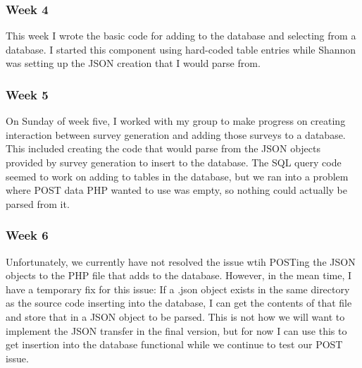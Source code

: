 \documentclass[letterpaper,10pt,serif, draftclsnofoot,onecolumn, compsoc, titlepage]{IEEEtran}
\begin{document}
\subsubsection{Week 4}
This week I wrote the basic code for adding to the database and selecting from a database.
I started this component using hard-coded table entries while Shannon was setting up the JSON creation that I would parse from.
\subsubsection{Week 5}
On Sunday of week five, I worked with my group to make progress on creating interaction between survey generation and adding those surveys to a database.
This included creating the code that would parse from the JSON objects provided by survey generation to insert to the database.
The SQL query code seemed to work on adding to tables in the database, but we ran into a problem where POST data PHP wanted to use was empty, so nothing could actually be parsed from it.
\subsubsection{Week 6}
Unfortunately, we currently have not resolved the issue wtih POSTing the JSON objects to the PHP file that adds to the database.
However, in the mean time, I have a temporary fix for this issue:
If a .json object exists in the same directory as the source code inserting into the database, I can get the contents of that file and store that in a JSON object to be parsed.
This is not how we will want to implement the JSON transfer in the final version, but for now I can use this to get insertion into the database functional while we continue to test our POST issue.
\end{document}
